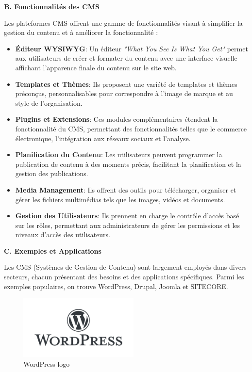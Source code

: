 \textbf{B. Fonctionnalités des CMS}


Les plateformes CMS offrent une gamme de fonctionnalités visant à simplifier la gestion du contenu et à améliorer la fonctionnalité :


\begin{itemize}
    \item \textbf{Éditeur WYSIWYG}: Un éditeur \textit{"What You See Is What You Get"} permet aux utilisateurs de créer et formater du contenu avec une interface visuelle affichant l'apparence finale du contenu sur le site web.

    \item \textbf{Templates et Thèmes}: Ils proposent une variété de templates et thèmes préconçus, personnalisables pour correspondre à l'image de marque et au style de l'organisation.

    \item \textbf{Plugins et Extensions}: Ces modules complémentaires étendent la fonctionnalité du CMS, permettant des fonctionnalités telles que le commerce électronique, l'intégration aux réseaux sociaux et l'analyse.

    \item \textbf{Planification du Contenu}: Les utilisateurs peuvent programmer la publication de contenu à des moments précis, facilitant la planification et la gestion des publications.
    \item \textbf{Media Management}: Ils offrent des outils pour télécharger, organiser et gérer les fichiers multimédias tels que les images, vidéos et documents.

    \item \textbf{Gestion des Utilisateurs}: Ils prennent en charge le contrôle d'accès basé sur les rôles, permettant aux administrateurs de gérer les permissions et les niveaux d'accès des utilisateurs.
\end{itemize}

\textbf{C. Exemples et Applications}

Les CMS (Systèmes de Gestion de Contenu) sont largement employés dans divers secteurs, chacun présentant des besoins et des applications spécifiques. Parmi les exemples populaires, on trouve WordPress, Drupal, Joomla et SITECORE.
\begin{figure}[H]
    \centering
    \includegraphics[width=6cm]{Figures/WordPress.png}
    \caption{WordPress logo}
    \label{fig:my_label} %
\end{figure}

